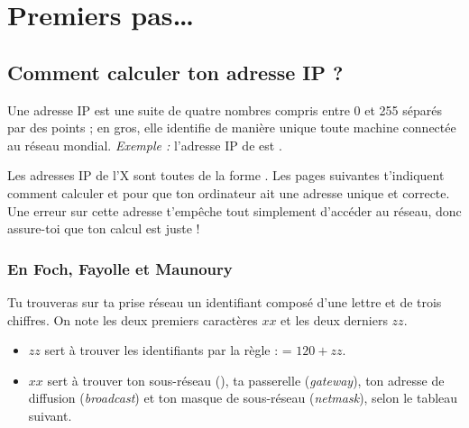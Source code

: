 \section{Premiers pas\ldots}

\subsection{Comment calculer ton adresse IP ?}

\label{calcul_ip}

Une adresse IP est une suite de quatre nombres compris entre 0 et
255 s\'epar\'es par des points ; en gros, elle identifie de mani\`ere
unique toute machine connect\'ee au r\'eseau mondial. \emph{Exemple :}
l'adresse IP de  est .

Les adresses IP de l'X sont toutes de la forme .
Les pages suivantes t'indiquent comment calculer  et  pour que ton
ordinateur ait une adresse unique et correcte. Une erreur sur cette adresse t'emp\^eche tout simplement d'acc\'eder au r\'eseau, donc assure-toi que ton calcul est juste !


\subsubsection{En Foch, Fayolle et Maunoury}
Tu trouveras sur ta prise r\'eseau un identifiant compos\'e d'une lettre et de trois chiffres.
On note les deux premiers caract\`eres $xx$ et les deux derniers $zz$.
\begin{itemize}
\item $zz$ sert \`a trouver les identifiants  par la r\`egle :  = $120 + zz$.

\item $xx$ sert \`a trouver ton sous-r\'eseau (), ta passerelle (\emph{gateway}),
ton adresse de diffusion (\emph{broadcast}) et ton masque de sous-réseau (\emph{netmask}), selon le tableau suivant.
\end{itemize}


